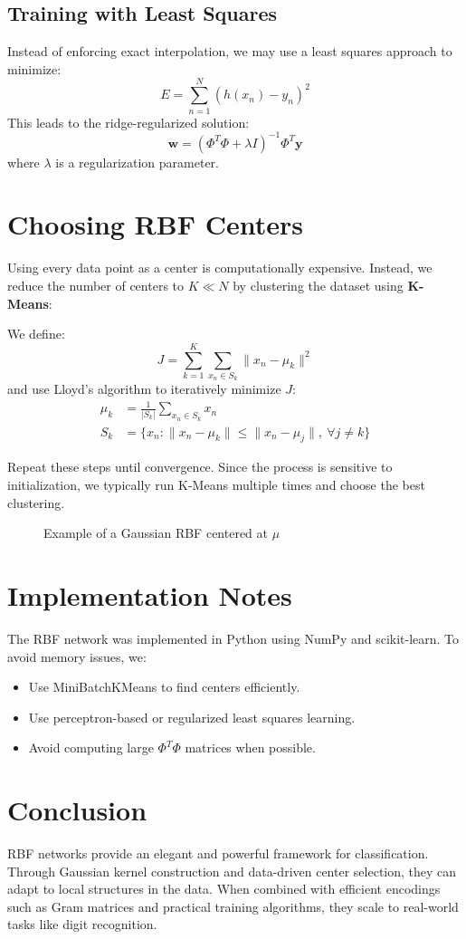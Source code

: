 \subsection{Training with Least Squares}
Instead of enforcing exact interpolation, we may use a least squares approach to minimize:
\[
E = \sum_{n=1}^N (h(x_n) - y_n)^2
\]
This leads to the ridge-regularized solution:
\[
\mathbf{w} = (\Phi^T\Phi + \lambda I)^{-1}\Phi^T \mathbf{y}
\]
where $\lambda$ is a regularization parameter.

\section{Choosing RBF Centers}
Using every data point as a center is computationally expensive. Instead, we reduce the number of centers to $K \ll N$ by clustering the dataset using \textbf{K-Means}:

We define:
\[
J = \sum_{k=1}^K \sum_{x_n \in S_k} \| x_n - \mu_k \|^2
\]
and use Lloyd's algorithm to iteratively minimize $J$:
\begin{align*}
\mu_k &= \frac{1}{|S_k|}\sum_{x_n \in S_k} x_n \\
S_k &= \{ x_n : \|x_n - \mu_k\| \leq \|x_n - \mu_j\|,\ \forall j \neq k \}
\end{align*}

Repeat these steps until convergence. Since the process is sensitive to initialization, we typically run K-Means multiple times and choose the best clustering.

\begin{figure}[h!]
    \centering
    
    \caption{Example of a Gaussian RBF centered at $\mu$}
    \label{fig:gaussian_rbf}
\end{figure} 

\section{Implementation Notes}
The RBF network was implemented in Python using NumPy and scikit-learn. To avoid memory issues, we:
\begin{itemize}
    \item Use MiniBatchKMeans to find centers efficiently.
    \item Use perceptron-based or regularized least squares learning.
    \item Avoid computing large $\Phi^T\Phi$ matrices when possible.
\end{itemize}

\section{Conclusion}
RBF networks provide an elegant and powerful framework for classification. Through Gaussian kernel construction and data-driven center selection, they can adapt to local structures in the data. When combined with efficient encodings such as Gram matrices and practical training algorithms, they scale to real-world tasks like digit recognition.

{}



